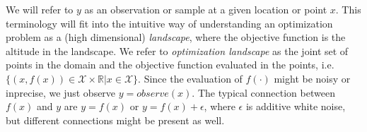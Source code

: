 We will refer to $y$ as an observation or sample at a given location or point $x$. This terminology will fit into the intuitive
way of understanding an optimization problem as a (high dimensional) \textit{landscape}, 
where the objective function is the altitude in the landscape. 
We refer to \textit{optimization landscape} as the joint set of points in the domain and the objective function
evaluated in the points, i.e. $\{(x,f(x))\in \mathcal{X} \times \mathbb{R}| x \in \mathcal{X}\}$. Since
the evaluation of $f(\cdot)$ might be noisy or inprecise, we just observe $y = observe(x)$. The typical
connection between $f(x)$ and $y$ are $y = f(x)$ or $y = f(x) + \epsilon$, where $\epsilon$ is additive white noise, 
but different connections might be present as well. 
